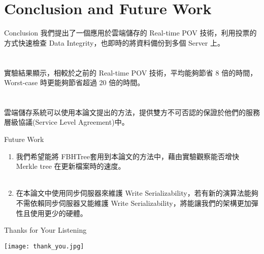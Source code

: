 \section{Conclusion and Future Work}

\begin{frame}{Conclusion}
	我們提出了一個應用於雲端儲存的 Real-time POV 技術，利用投票的方式快速檢查 Data Integrity，也即時的將資料備份到多個 Server 上。\\
    ~\\
    ~\\
    實驗結果顯示，相較於之前的 Real-time POV 技術，平均能夠節省 8 倍的時間，Worst-case 時更能夠節省超過 20 倍的時間。\\
    ~\\
    ~\\
    雲端儲存系統可以使用本論文提出的方法，提供雙方不可否認的保證於他們的服務層級協議(Service Level Agreement)中。
\end{frame}

\begin{frame}{Future Work}
	\begin{enumerate}
		\item 我們希望能將 FBHTree\footnotemark 套用到本論文的方法中，藉由實驗觀察能否增快 Merkle tree 在更新檔案時的速度。\\
        ~\\
        \item 在本論文中使用同步伺服器來維護 Write Serializability，若有新的演算法能夠不需依賴同步伺服器又能維護 Write Serializability，將能讓我們的架構更加彈性且使用更少的硬體。
	\end{enumerate}
\end{frame}

\begin{frame}{Thanks for Your Listening}
	\begin{center}
		\texttt{[image: thank\_you.jpg]}
	\end{center}	
\end{frame}